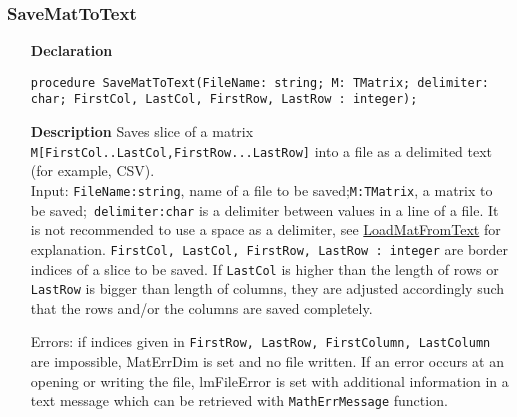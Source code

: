 \documentclass[12pt,a4paper,oneside]{report}
\newcommand{\declarationitem}[1]{\textbf{#1}}
\newcommand{\descriptiontitle}[1]{\textbf{#1}}
\newcommand{\code}[1]{\texttt{#1}}
\begin{document}
\subsubsection{SaveMatToText}\label{uvecfileutils:savemattotext}
\begin{itemize}
	\item[\declarationitem{Declaration}\hfill]
	\begin{flushleft}
	\code{procedure SaveMatToText(FileName: string; M: TMatrix; delimiter: char; FirstCol, LastCol, FirstRow, LastRow : integer);}	
	\end{flushleft}
	\item[\descriptiontitle{Description}] Saves slice of a matrix \code{M[FirstCol..LastCol,FirstRow...LastRow]} into a file as a delimited text (for example, CSV).\\ 
	Input: \code{FileName:string}, name of a file to be saved;\code{M:TMatrix}, a matrix to be saved;\code{ delimiter:char} is a delimiter between values in a line of a file. It is not recommended to use a space as a delimiter, see \hyperref[uvecfileutils:LoadMatFromText]{LoadMatFromText} for explanation. \code{FirstCol, LastCol, FirstRow, LastRow : integer} are border indices of a slice to be saved. If \code{LastCol} is higher than the length of rows or \code{LastRow} is bigger than length of columns, they are adjusted accordingly such that the rows and/or the columns are saved completely.
	
	Errors: if indices given in \code{FirstRow, LastRow, FirstColumn, LastColumn} are impossible, MatErrDim is set and no file written. If an error occurs at an opening or writing the file, lmFileError is set with additional information in a text message which can be retrieved with \code{MathErrMessage} function.	  
\end{itemize}	
\end{document}
